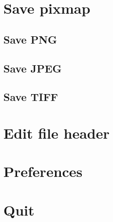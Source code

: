 \newpage 
\section{Save pixmap}
\subsection{Save PNG}
\subsection{Save JPEG}
\subsection{Save TIFF}

\newpage 
\section{Edit file header}

\newpage 
\section{Preferences}

\newpage 
\section{Quit}

